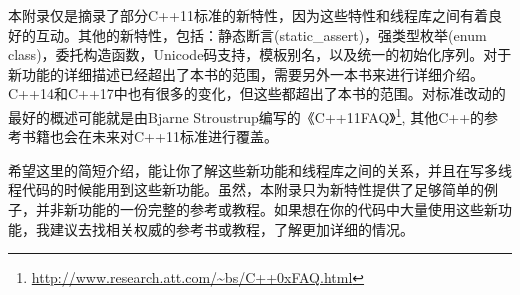 
本附录仅是摘录了部分C++11标准的新特性，因为这些特性和线程库之间有着良好的互动。其他的新特性，包括：静态断言(static\_assert)，强类型枚举(enum class)，委托构造函数，Unicode码支持，模板别名，以及统一的初始化序列。对于新功能的详细描述已经超出了本书的范围，需要另外一本书来进行详细介绍。C++14和C++17中也有很多的变化，但这些都超出了本书的范围。对标准改动的最好的概述可能就是由Bjarne Stroustrup编写的《C++11FAQ》\footnote[1]{\url{http://www.research.att.com/~bs/C++0xFAQ.html}}, 其他C++的参考书籍也会在未来对C++11标准进行覆盖。

希望这里的简短介绍，能让你了解这些新功能和线程库之间的关系，并且在写多线程代码的时候能用到这些新功能。虽然，本附录只为新特性提供了足够简单的例子，并非新功能的一份完整的参考或教程。如果想在你的代码中大量使用这些新功能，我建议去找相关权威的参考书或教程，了解更加详细的情况。


